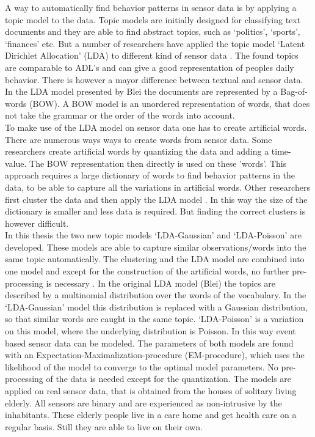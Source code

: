 A way to automatically find behavior patterns in sensor data is by applying a topic model to the data. Topic models are initially designed for classifying text documents and they are able to find abstract topics, such as `politics', `sports', `finances' etc. But a number of researchers have applied the topic model `Latent Dirichlet Allocation' (LDA) to different kind of sensor data \cite{farrahi2008daily,journals/percom/ChikhaouiWP12}. The found topics are comparable to ADL's and can give a good representation of peoples daily behavior.
There is however a mayor difference between textual and sensor data. In the LDA model presented by Blei \cite{blei2003latent} the documents are represented by a Bag-of-words (BOW). A BOW model is an unordered representation of words, that does not take the grammar or the order of the words into account.\\

To make use of the LDA model on sensor data one has to create artificial words. There are numerous ways ways to create words from sensor data.
Some researchers create artificial words by quantizing the data and adding a time-value. The BOW representation then directly is used on these 'words'\cite{farrahi2008daily,EXSY:EXSY12033}. This approach requires a large dictionary of words to find behavior patterns in the data, to be able to capture all the variations in artificial words. Other researchers first cluster the data and then apply the LDA model \cite{Huynh:2008:DAP:1409635.1409638,Casale:2009}. In this way the size of the dictionary is smaller and less data is required.  But finding the correct clusters is however difficult.\\

In this thesis the two new topic models `LDA-Gaussian' and `LDA-Poisson' are developed. These models are able to capture similar observations/words into the same topic automatically. The clustering and the LDA model are combined into one model and except for the construction of the artificial words, no further pre-processing is necessary .
In the original LDA model (Blei) the topics are described by a multinomial distribution over the words of the vocabulary. In the `LDA-Gaussian' model this distribution is replaced with a Gaussian distribution, so that similar words are caught in the same topic. `LDA-Poisson' is a variation on this model, where the underlying distribution is Poisson. In this way event based sensor data can be modeled.
The parameters of both models are found with an Expectation-Maximalization-procedure (EM-procedure), which uses the likelihood of the model to converge to the optimal model parameters. No pre-processing of the data is needed except for the quantization. The models are applied on real sensor data, that is obtained from the houses of solitary living elderly. 
All sensors are binary and are experienced as non-intrusive by the inhabitants. These elderly people live in a care home and get health care on a regular basis. Still they are able to live on their own.\\


